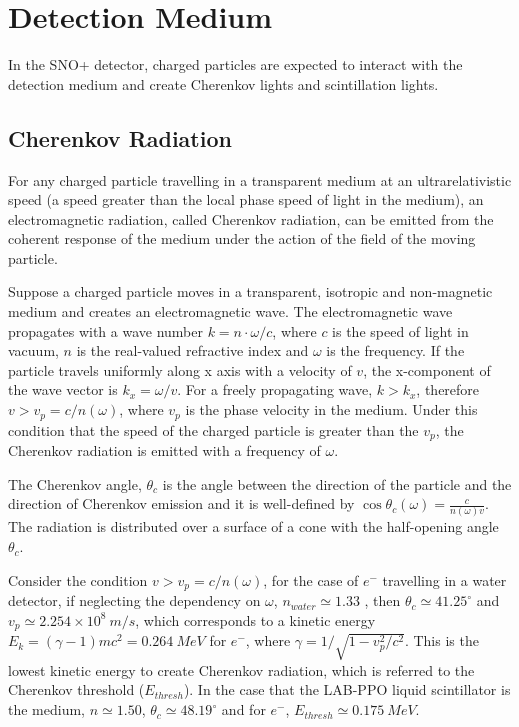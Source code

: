\section{Detection Medium}
In the SNO+ detector, charged particles are expected to interact with the detection medium and create Cherenkov lights and scintillation lights. 

\subsection{Cherenkov Radiation}
For any charged particle travelling in a transparent medium at an ultrarelativistic speed (a speed greater than the local phase speed of light in the medium), an electromagnetic radiation, called Cherenkov radiation, can be emitted from the coherent response of the medium under the action of the field of the moving particle\cite{jackson2007classical,landau2013electrodynamics}.

Suppose a charged particle moves in a transparent, isotropic and non-magnetic medium and creates an electromagnetic wave. The electromagnetic wave propagates with a wave number $k=n\cdot\omega/c$, where $c$ is the speed of light in vacuum, $n$ is the real-valued refractive index and $\omega$ is the frequency. If the particle travels uniformly along x axis with a velocity of $v$, the x-component of the wave vector is $k_x=\omega/v$. For a freely propagating wave, $k>k_x$, therefore $v>v_p=c/n(\omega)$, where $v_p$ is the phase velocity in the medium. Under this condition that the speed of the charged particle is greater than the $v_p$, the Cherenkov radiation is emitted with a frequency of $\omega$\cite{landau2013electrodynamics}.   

The Cherenkov angle, $\theta_c$ is the angle between the direction of the particle and the direction of Cherenkov emission and it is well-defined by $\cos\theta_c(\omega) = \frac{c}{n(\omega)v}$. The radiation is distributed over a surface of a cone with the half-opening angle $\theta_c$. 

Consider the condition $v>v_p=c/n(\omega)$, for the case of $e^-$ travelling in a water detector, if neglecting the dependency on $\omega$, $n_{water}\simeq 1.33$ \cite{pdg2018}, then $\theta_c\simeq 41.25^\circ$ and $v_p\simeq 2.254\times10^8~m/s$, which corresponds to a kinetic energy $E_k=(\gamma-1)mc^2=0.264~MeV$ for $e^-$, where $\gamma=1/\sqrt{1-v_p^2/c^2}$. This is the lowest kinetic energy to create Cherenkov radiation, which is referred to the Cherenkov threshold ($E_{thresh}$). In the case that the LAB-PPO liquid scintillator is the medium, $n\simeq 1.50$\cite{tseung2011ellipsometric}, $\theta_c\simeq 48.19^\circ$ and for $e^-$, $E_{thresh}\simeq 0.175~MeV$.   


